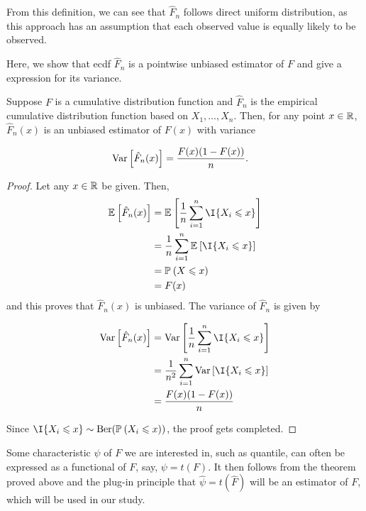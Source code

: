 \documentclass{report}
\begin{document}
\begin{rem}
    From this definition, we can see that $\hat F_n$ follows direct uniform distribution, as this approach has an assumption that
    each observed value is equally likely to be observed.
\end{rem}

Here, we show that ecdf $\hat F_n$ is a pointwise unbiased estimator of $F$ and give a expression for its variance.

\begin{thm}\label{thm: mean, var of ecdf}
Suppose $F$ is a cumulative distribution function and $\hat F_n$ is the empirical cumulative
distribution function based on $X_1,\ldots, X_n$. Then, for any point $ x \in \mathbb{R}$,
$\hat F_n(x)$ is an unbiased estimator of $F(x)$ with variance

\begin{align*}
    \mathrm{Var} \left[ \hat F_n(x) \right] &= \frac{F(x)(1- F(x))}{n}.
\end{align*}
\end{thm}

\begin{proof}
    Let any $x \in \mathbb{R}$ be given. Then,
    \begin{align*}
        \E{\hat F_n(x)} &= \E{\frac{1}{n} \sumi{n} \I{X_i \leqslant x}}
        \\
        &=  \frac{1}{n}\sumi{n} \E{\I{X_i \leqslant x}}
        \\
        &= \P{X \leqslant x}
        \\
        &= F(x)
    \end{align*}
    and this proves that $\hat F_n(x)$ is unbiased. The variance of $\hat F_n$ is given by
    
    \begin{align*}
        \Var{\hat F_n(x)} &= \Var{\frac{1}{n} \sumi{n} \I{X_i \leqslant x}}
        \\
        &= \frac{1}{n^2} \sumi{n} \Var{\I{X_i \leqslant x}}
        \\
        &= \frac{F(x)(1- F(x))}{n}
    \end{align*}
    
    Since $\I{X_i \leqslant x} \sim \mathrm{Ber}(\P{X_i \leqslant x})$, the proof gets completed.
\end{proof}

Some characteristic $\psi$ of $F$ we are interested in, such as quantile, can often be expressed as a functional of $F$, say, $\psi = t(F)$.
It then follows from the theorem proved above and the plug-in principle that $\hat \psi = t(\hat F)$ will be an estimator of $F$, which will
be used in our study.
\end{document}
